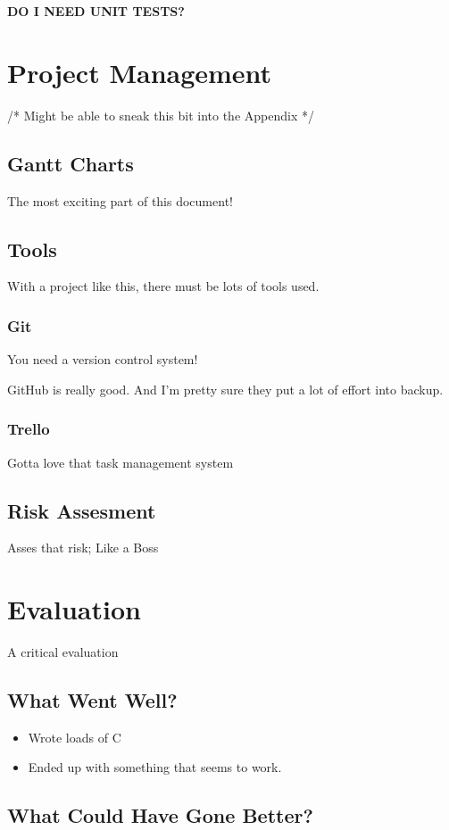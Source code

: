 \documentclass[12pt]{report}
\begin{document}
\textbf{DO I NEED UNIT TESTS?}

\chapter{Project Management}
/* Might be able to sneak this bit into the Appendix */

\section{Gantt Charts}
The most exciting part of this document!

\section{Tools}
With a project like this, there must be lots of tools used. 

\subsection{Git}
You need a version control system!

GitHub is really good. And I'm pretty sure they put a lot of effort into backup.

\subsection{Trello}
Gotta love that task management system

\section{Risk Assesment}
Asses that risk; Like a Boss

\chapter{Evaluation}
A critical evaluation

\section{What Went Well?}

\begin{itemize}
\item Wrote loads of C
\item Ended up with something that seems to work.
\end{itemize}

\section{What Could Have Gone Better?}
\end{document}
